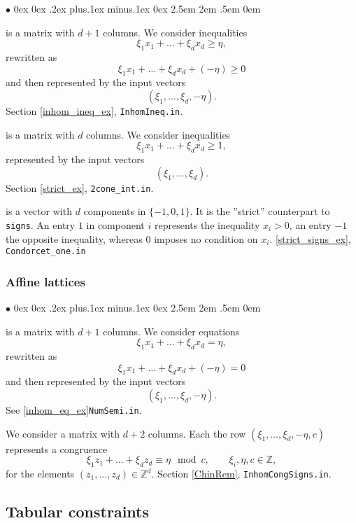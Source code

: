 \documentclass[12pt,a4paper]{scrartcl}
\newcommand{\stdli}{ \topsep0ex \partopsep0ex %
\parsep.2ex plus.1ex minus.1ex \itemsep0ex%
\leftmargin2.5em \labelwidth2em \labelsep.5em \rightmargin0em}%
\renewenvironment{itemize}{\begin{list}{{$\bullet$}}{\stdli}}{\end{list}}
\theoremstyle{definition}
\def\ZZ{{\mathbb Z}}
\def\itemtt[#1]{\item[\textbf{\ttt{#1}}]}
\def\ttt{\texttt}
\begin{document}
\begin{itemize}
	\itemtt[inhom\_inequalities] is a matrix with $d+1$ columns. We consider inequalities
	$$
	\xi_1x_1+\dots+\xi_dx_d\ge \eta,
	$$
	rewritten as
	$$
	\xi_1x_1+\dots+\xi_dx_d+(-\eta) \ge 0
	$$
	and then represented by the input vectors
	$$
	(\xi_1,\dots,\xi_d,-\eta).
	$$
	Section \ref{inhom_ineq_ex}, \verb|InhomIneq.in|.
	
	\itemtt[strict\_inequalities] is a matrix with $d$ columns. We consider inequalities
	$$
	\xi_1x_1+\dots+\xi_dx_d\ge 1,
	$$
	represented by the input vectors
	$$
	(\xi_1,\dots,\xi_d).
	$$
	Section \ref{strict_ex}, \verb|2cone_int.in|.
	
	\itemtt[strict\_signs] is a vector with $d$ components in $\{-1,0,1\}$. It is the ''strict'' counterpart to \verb|signs|. An entry $1$ in component $i$ represents the inequality $x_i>0$, an entry $-1$ the opposite inequality, whereas $0$ imposes no condition on $x_i$. \ref{strict_signs_ex}, \verb|Condorcet_one.in|
\end{itemize}

\subsubsection{Affine lattices}

\begin{itemize}
	\itemtt[inhom\_equations] is a matrix with $d+1$ columns. We consider equations
	$$
	\xi_1x_1+\dots+\xi_dx_d= \eta, 
	$$
	rewritten as
	$$
	\xi_1x_1+\dots+\xi_dx_d+(-\eta) = 0
	$$
	and then represented by the input vectors
	$$
	(\xi_1,\dots,\xi_d,-\eta).
	$$
	See \ref{inhom_eq_ex}\verb|NumSemi.in|.
	
	\itemtt[inhom\_congruences] We consider a matrix with $d+2$ columns. Each  the row $(\xi_1,\dots,\xi_d,-\eta,c)$ represents a congruence
	$$
	\xi_1z_1+\dots+\xi_dz_d\equiv \eta \mod c, \qquad \xi_i,\eta,c\in\ZZ,
	$$
	for the elements $(z_1,\dots,z_d)\in\ZZ^d$. Section \ref{ChinRem}, \verb|InhomCongSigns.in|.
\end{itemize}

\subsection{Tabular constraints}
\end{document}
